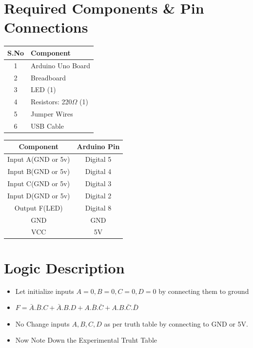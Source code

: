 \documentclass[a4paper,12pt]{article}
\begin{document}
\section*{Required Components \& Pin Connections}
\begin{center}
\begin{minipage}{0.45\textwidth}
\begin{table}[H]
\centering
\begin{tabular}{|c|l|}
\hline
\textbf{S.No} & \textbf{Component} \\ \hline
1 & Arduino Uno Board \\
2 & Breadboard \\
3 & LED (1) \\
4 & Resistors: 220$\Omega$ (1) \\
5 & Jumper Wires \\
6 & USB Cable \\
\hline
\end{tabular}
\end{table}
\end{minipage}
\hspace{0.05\textwidth}
\begin{minipage}{0.45\textwidth}
\begin{table}[H]
\centering
\begin{tabular}{|c|c|}
\hline
\textbf{Component} & \textbf{Arduino Pin} \\ \hline
Input A(GND or 5v) & Digital 5 \\
Input B(GND or 5v) & Digital 4 \\
Input C(GND or 5v) & Digital 3 \\
Input D(GND or 5v) & Digital 2 \\
Output F(LED) & Digital 8 \\
GND & GND \\
VCC & 5V \\
\hline
\end{tabular}
\end{table}
\end{minipage}
\end{center}
\section*{Logic Description}
\begin{itemize}
        \item Let initialize inputs $A=0,B=0,C=0,D=0$ by connecting them to ground
        \item $F = \bar{A}.\bar{B}.C + \bar{A}.B.D + A.\bar{B}.\bar{C} + A.B.\bar{C}.\bar{D} $
	\item No Change inputs $A,B,C,D$ as per truth table by connecting to GND or 5V.
	\item Now Note Down the Experimental Truht Table
\end{itemize}
\end{document}
